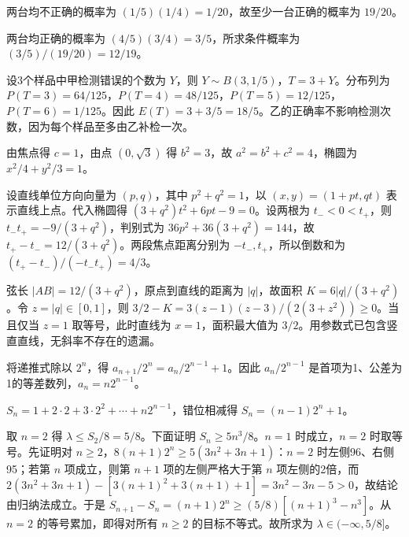 \begin{Subquestions}
\item {}两台均不正确的概率为 $(1/5)(1/4)=1/20$，故至少一台正确的概率为 $19/20$。
\item {}两台均正确的概率为 $(4/5)(3/4)=3/5$，所求条件概率为 $(3/5)/(19/20)=12/19$。
\item {}设3个样品中甲检测错误的个数为 $Y$，则 $Y\sim B(3,1/5)$，$T=3+Y$。分布列为 $P(T=3)=64/125$，$P(T=4)=48/125$，$P(T=5)=12/125$，$P(T=6)=1/125$。因此 $E(T)=3+3/5=18/5$。乙的正确率不影响检测次数，因为每个样品至多由乙补检一次。
\end{Subquestions}
\begin{Subquestions}
\item {}由焦点得 $c=1$，由点 $(0,\sqrt3)$ 得 $b^2=3$，故 $a^2=b^2+c^2=4$，椭圆为 $x^2/4+y^2/3=1$。
\item {}设直线单位方向向量为 $(p,q)$，其中 $p^2+q^2=1$，以 $(x,y)=(1+pt,qt)$ 表示直线上点。代入椭圆得 $(3+q^2)t^2+6pt-9=0$。设两根为 $t_-<0<t_+$，则 $t_-t_+=-9/(3+q^2)$，判别式为 $36p^2+36(3+q^2)=144$，故 $t_+-t_-=12/(3+q^2)$。两段焦点距离分别为 $-t_-,t_+$，所以倒数和为 $(t_+-t_-)/(-t_-t_+)=4/3$。
\item {}弦长 $|AB|=12/(3+q^2)$，原点到直线的距离为 $|q|$，故面积 $K=6|q|/(3+q^2)$。令 $z=|q|\in[0,1]$，则 $3/2-K=3(z-1)(z-3)/(2(3+z^2))\geq0$。当且仅当 $z=1$ 取等号，此时直线为 $x=1$，面积最大值为 $3/2$。用参数式已包含竖直直线，无斜率不存在的遗漏。
\end{Subquestions}
\newpage
{}
\begin{Subquestions}
\item {}将递推式除以 $2^n$，得 $a_{n+1}/2^n=a_n/2^{n-1}+1$。因此 $a_n/2^{n-1}$ 是首项为1、公差为1的等差数列，$a_n=n2^{n-1}$。
\item {}$S_n=1+2\cdot2+3\cdot2^2+\cdots+n2^{n-1}$，错位相减得 $S_n=(n-1)2^n+1$。
\item {}取 $n=2$ 得 $\lambda\leq S_2/8=5/8$。下面证明 $S_n\geq5n^3/8$。$n=1$ 时成立，$n=2$ 时取等号。先证明对 $n\geq2$，$8(n+1)2^n\geq5(3n^2+3n+1)$：$n=2$ 时左侧96、右侧95；若第 $n$ 项成立，则第 $n+1$ 项的左侧严格大于第 $n$ 项左侧的2倍，而 $2(3n^2+3n+1)-[3(n+1)^2+3(n+1)+1]=3n^2-3n-5>0$，故结论由归纳法成立。于是 $S_{n+1}-S_n=(n+1)2^n\geq(5/8)[(n+1)^3-n^3]$。从 $n=2$ 的等号累加，即得对所有 $n\geq2$ 的目标不等式。故所求为 $\lambda\in(-\infty,5/8]$。
\end{Subquestions}
